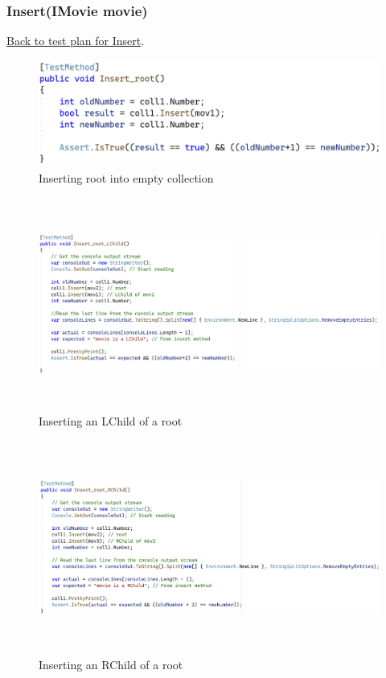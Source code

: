 \documentclass[a4paper]{article}
\begin{document}
\subsubsection{Insert{(IMovie movie)}}
\hyperlink{subsubsection.3.2.2}{Back to test plan for Insert}.
\begin{figure}[H]
    \includegraphics[height=3.5cm]{data/Insert_root.png}
    \caption{Inserting root into empty collection}
\end{figure}
\begin{figure}[H]
    \includegraphics[height=7cm]{data/Insert_root_LChild.png}
    \caption{Inserting an LChild of a root}
\end{figure}
\begin{figure}[H]
    \includegraphics[height=7cm]{data/Insert_root_RChild.png}
    \caption{Inserting an RChild of a root}
\end{figure}
\end{document}
